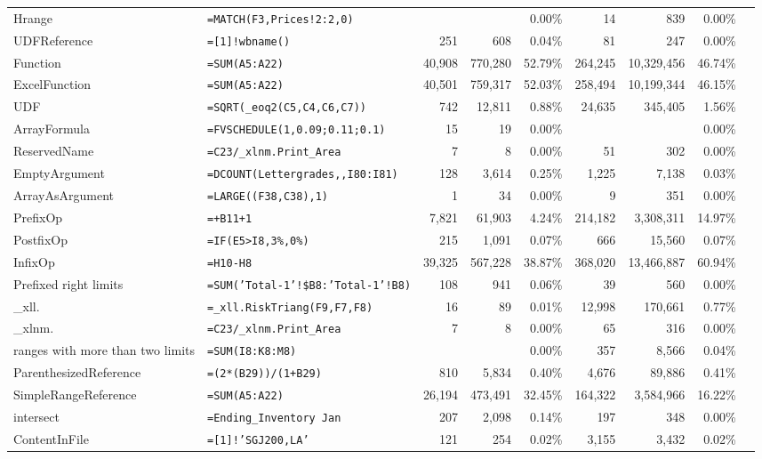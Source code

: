 \documentclass[conference]{IEEEtran}
\begin{document}
\begin{table*}
\begin{tabular}{llrrrrrrr}
		Hrange & \texttt{=MATCH(F3,Prices!2:2,0)} &  &  & 0.00\% & 14 & 839 & 0.00\%\\
		UDFReference & \texttt{=[1]!wbname()} & 251 & 608 & 0.04\% & 81 & 247 & 0.00\%\\
		Function & \texttt{=SUM(A5:A22)} & 40,908 & 770,280 & 52.79\% & 264,245 & 10,329,456 & 46.74\%\\
		ExcelFunction & \texttt{=SUM(A5:A22)} & 40,501 & 759,317 & 52.03\% & 258,494 & 10,199,344 & 46.15\%\\
		UDF & \texttt{=SQRT(_eoq2(C5,C4,C6,C7))} & 742 & 12,811 & 0.88\% & 24,635 & 345,405 & 1.56\%\\
		ArrayFormula & \texttt{=FVSCHEDULE(1,{0.09;0.11;0.1})} & 15 & 19 & 0.00\% &  &  & 0.00\%\\
		ReservedName & \texttt{=C23/_xlnm.Print_Area} & 7 & 8 & 0.00\% & 51 & 302 & 0.00\%\\
		EmptyArgument & \texttt{=DCOUNT(Lettergrades,,I80:I81)} & 128 & 3,614 & 0.25\% & 1,225 & 7,138 & 0.03\%\\
		ArrayAsArgument & \texttt{=LARGE((F38,C38),1)} & 1 & 34 & 0.00\% & 9 & 351 & 0.00\%\\
		PrefixOp & \texttt{=+B11+1} & 7,821 & 61,903 & 4.24\% & 214,182 & 3,308,311 & 14.97\%\\
		PostfixOp & \texttt{=IF(E5>I8,3\%,0\%)} & 215 & 1,091 & 0.07\% & 666 & 15,560 & 0.07\%\\
		InfixOp & \texttt{=H10-H8} & 39,325 & 567,228 & 38.87\% & 368,020 & 13,466,887 & 60.94\%\\
		\hline
		Prefixed right limits & \texttt{=SUM('Total-1'!\$B8:'Total-1'!B8)} & 108 & 941 & 0.06\% & 39 & 560 & 0.00\%\\
		_xll. & \texttt{=_xll.RiskTriang(F9,F7,F8)} & 16 & 89 & 0.01\% & 12,998 & 170,661 & 0.77\%\\
		_xlnm. & \texttt{=C23/_xlnm.Print_Area} & 7 & 8 & 0.00\% & 65 & 316 & 0.00\%\\
		ranges with more than two limits & \texttt{=SUM(I8:K8:M8)} &  &  & 0.00\% & 357 & 8,566 & 0.04\%\\
		ParenthesizedReference & \texttt{=(2*(B29))/(1+B29)} & 810 & 5,834 & 0.40\% & 4,676 & 89,886 & 0.41\%\\
		SimpleRangeReference & \texttt{=SUM(A5:A22)} & 26,194 & 473,491 & 32.45\% & 164,322 & 3,584,966 & 16.22\%\\
		intersect & \texttt{=Ending_Inventory Jan} & 207 & 2,098 & 0.14\% & 197 & 348 & 0.00\%\\
		ContentInFile & \texttt{=[1]!'SGJ200,LA'} & 121 & 254 & 0.02\% & 3,155 & 3,432 & 0.02\%\\
	\end{tabular}
\end{table*}
\end{document}
